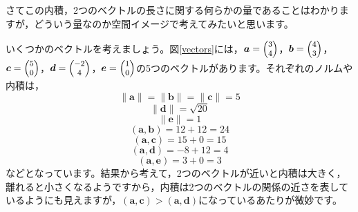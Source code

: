 \documentclass{ltjsbook}
\begin{document}
さてこの内積，2つのベクトルの長さに関する何らかの量であることはわかりますが，どういう量なのか空間イメージで考えてみたいと思います。

いくつかのベクトルを考えましょう。図\ref{vectors}には，$\bm{a}=\footnotesize\begin{pmatrix}3\\4\end{pmatrix}$，$\bm{b}=\footnotesize\begin{pmatrix}4\\3\end{pmatrix}$，$\bm{c}=\footnotesize\begin{pmatrix}5\\0\end{pmatrix}$，$\bm{d}=\footnotesize\begin{pmatrix}-2\\4\end{pmatrix}$，$\bm{e}=\footnotesize\begin{pmatrix}1\\0\end{pmatrix}$の5つのベクトルがあります。それぞれのノルムや内積は，
\[ \| \bm{a} \| = \| \bm{b} \| = \| \bm{c} \| = 5 \]
\[ \| \bm{d} \| = \sqrt{20} \]
\[ \| \bm{e} \| = 1 \]
\[ (\bm{a}, \bm{b}) = 12 + 12 =24\]
\[ (\bm{a}, \bm{c}) = 15 + 0 =15\]
\[ (\bm{a}, \bm{d}) = -8 + 12 = 4\]
\[ (\bm{a}, \bm{e}) = 3 + 0 = 3\]
などとなっています。結果から考えて，2つのベクトルが近いと内積は大きく，離れると小さくなるようですから，内積は2つのベクトルの関係の近さを表しているようにも見えますが，$(\bm{a},\bm{c}) > (\bm{a},\bm{d})$になっているあたりが微妙です。
\end{document}
